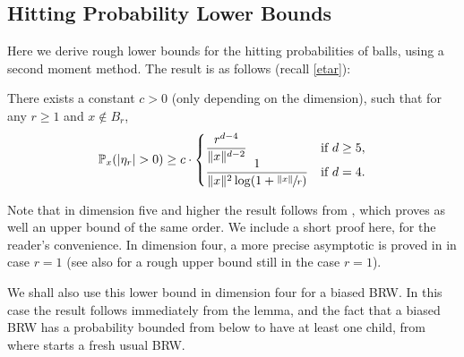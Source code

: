 \subsection{Hitting Probability Lower Bounds}\label{sec.hitting}
Here we derive rough lower bounds for the hitting probabilities of balls, using a second moment method. The result is as follows (recall \eqref{etar}):

\begin{lemma}\label{lem.hitting}
There exists a constant $c>0$ (only depending on the dimension),
such that for any $r\ge 1$ and $x\notin B_r$,\vspace*{-3pt}\enlargethispage{\baselineskip}
\begin{equation*}
\mathbb P_x(|\eta_r|>0) \ge c\cdot
\begin{cases}
\dfrac{r^{d-4}}{\|x\|^{d-2}} & \text{if }d\ge 5, \\[-3pt]
\dfrac 1{\|x\|^2\log (1+\sfrac{\|x\|}{r}) }& \text{if }d=4.
\end{cases}
\end{equation*}
\end{lemma}

\begin{remark}
Note that in dimension five and higher the result follows from \cite{Zhu1}, which proves as well an upper bound of the same order.
We include a short proof here, for the reader's convenience.
In dimension four, a more precise asymptotic is proved in
\cite{Zhu3} in case $r=1$ (see also \cite{Zhu4} for a rough upper bound still in the case $r=1$).
\end{remark}

\begin{remark} \label{rem.lb.biased}
We shall also use this lower bound in dimension four for a biased BRW. In this case the result follows immediately from the lemma, and the fact that a biased BRW has a probability bounded from below to have at least one child, from where starts a fresh usual BRW.
\end{remark}

